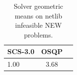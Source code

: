\begin{table}
\centering
\caption{Solver geometric means on netlib infeasible NEW problems.}
\label{t-netlib infeasible NEW-geom_mean}
\begin{tabular}{lcc}
\toprule
 SCS-3.0 &  OSQP \\
\midrule
    1.00 &  3.68 \\
\bottomrule
\end{tabular}
\end{table}
